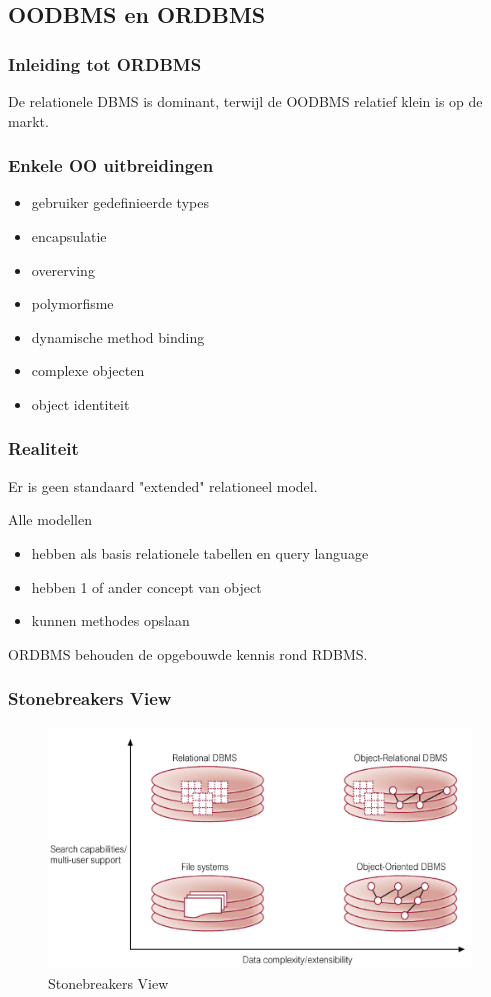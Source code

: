 \documentclass[a4paper,12pt]{article}
\begin{document}
\subsection{OODBMS en ORDBMS}
\subsubsection{Inleiding tot ORDBMS}
De relationele DBMS is dominant, terwijl de OODBMS relatief klein is op de markt.

\subsubsection{Enkele OO uitbreidingen}
\begin{itemize}
\item gebruiker gedefinieerde types
\item encapsulatie
\item overerving
\item polymorfisme
\item dynamische method binding
\item complexe objecten
\item object identiteit
\end{itemize}

\subsubsection{Realiteit}
Er is geen standaard "extended" relationeel model.

Alle modellen
\begin{itemize}
\item hebben als basis relationele tabellen en query language
\item hebben 1 of ander concept van object
\item kunnen methodes opslaan
\end{itemize}
ORDBMS behouden de opgebouwde kennis rond RDBMS.

\subsubsection{Stonebreakers View}
\begin{figure}[H]
\centering
\includegraphics[width=.7\linewidth]{img/StonebreakersView.png}
\caption{Stonebreakers View}
\label{fig:StonebreakersView}
\end{figure}
\end{document}
